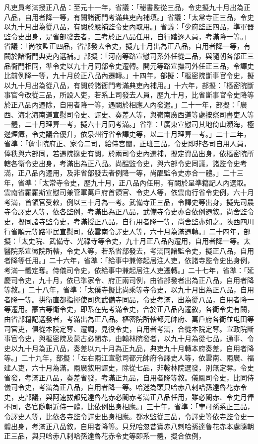 \begin{pinyinscope}
 凡吏員考滿授正八品：至元十一年，省議：「秘書監從三品，令史擬九十月出為正八品，自用者降一等，有闕諸衙門考滿典吏內補填。」省議：「太常寺正三品，令史以九十月出為從八品，有闕於應補監令史內取用。」省議：「少府監正四品，準軍器監令史出身，是省部發去者，三考於正八品任用，自行踏逐人員，考滿降一等。」省議：「尚牧監正四品，省部發去令史，擬九十月出為正八品，自用者降一等，有闕於諸衙門典吏內選補。」部擬：「河南等路宣慰司系外任從二品，與隨朝各部正三品衙門相同，準令史以九十月同部令史遷轉。開元等路宣撫司外任正三品，令譯史比前例降一等，九十月於正八品內遷轉。」十四年，部擬：「樞密院斷事官令史，擬以九十月出為從八品，有闕於諸衙門考滿典吏內補用。」十六年，部擬：「樞密院斷事官今改從三品，所設人吏，若系上司發去人員，歷九十月，比省斷事官令史降等於正八品內遷除，自用者降一等，遇闕於相應人內發遣。」二十一年，部擬：「廣西、海北海南道宣慰司令史、譯史、奏差人等，與嶺南廣西道等處按察司書吏人等一體，二十月理算一考，擬六十月同考滿。」省準：「廣東宣慰司其地倚山瀕海，極邊煙瘴，令史議合優升，依泉州行省令譯史等，以二十月理算一考。」二十二年，省準：「詹事院府正、家令二司，給侍宮闈，正班三品，令史即非各司自用人員，俸秩與六部同，若遇院掾史有闕，於兩司令史內選補，擬定資品出身，依樞密院所轄各衛令史出身，考滿出為正八品。尚醖監令史，與六部令史同議，諸監令史考滿，正八品內遷用，及非省部發去者例降一等，尚醖監令史亦合一體。」二十三年，省準：「太常寺令史，歷九十月，正八品內任用，有闕於呈準籍記人內選取。雲南省羅羅斯宣慰司兼管軍萬戶府首領官、令史人等，依雲南行省令史例，六十月考滿，首領官受敕，例以三十月為一考。武備寺正三品，令譯史等出身，擬先司農寺令譯史人等，依各監例，考滿出為正八品，武備寺令史亦合依例遷敘。尚舍監令史，擬同諸寺監令史，考滿授正八品，自行用者降一等，尚舍監亦如之。陜西四川行省順元等路軍民宣慰司，依雲南令譯史人等，六十月為滿遷轉。」二十四年，部擬：「太史院、武備寺、光祿寺等令史，九十月正八品內遷用，自用者降一等。太醫院系宣徽院所轄，令史人等，若系省部發去，考滿同諸監令史，擬正八品，自用者降等任用。」二十六年，省準：「給事中兼修起居注人吏，依諸寺監令史出身例，考滿一體定奪。侍儀司令史，依給事中兼起居注人吏遷轉。」二十七年，省準：「延慶司令史，九十月，依已準家令、府正兩司例，由省部發者出為正八品，自用者降等敘。」二十八年，省準：「太僕寺擬比尚乘等寺令史，以九十月出為正八品，自用者降一等。拱衛直都指揮使司與武備寺同品，令史考滿，出為從八品，自用者降一等遷用。蒙古等衛令史，即系在先考滿令史，合於正八品內遷敘，各衛令史有闕，由省部籍記選發者，考滿出為正八品。樞密院所轄都元帥府、萬戶府各衛並屯田等司官吏，俱從本院定奪、遷調，見役令史，自用者考滿，合從本院定奪。宣政院斷事官令史，與樞密院及蒙古必闍赤，由翰林院發者，以九十月為從七品，通事、令史以九十月為正八品，奏差以九十月為正九品，典吏九十月轉本府奏差，自用者降等。」二十九年，部擬：「左右兩江宣慰司都元帥府令譯史人等，依雲南、兩廣、福建人吏，六十月為滿。兩廣敘用譯史，除從七品，非翰林院選發，別無定奪。令史省發，考滿正八品，奏差省發，考滿正九品，自用者降等敘。儀鳳司令史，比同侍儀司令史，考滿為正八品，自用者降一等。哈迷為頭只哈赤八剌哈孫達魯花赤令史，吏部議，與阿速拔都兒達魯花赤必闍赤考滿正八品任用，雖必闍赤、令史月俸不同，各官隨朝近侍一體，比依例出身相應。」三十年，省準：「孛可孫系正三品，令譯史人等，比依各寺監令譯史出身相應。都水監從三品，令譯史等依寺監令史一體出身，考滿正八品敘，自用者降等。只兒哈忽昔寶赤八剌哈孫達魯花赤本處隨朝正三品，與只哈赤八剌哈孫達魯花赤令史等即系一體，擬合依例，
\end{pinyinscope}
